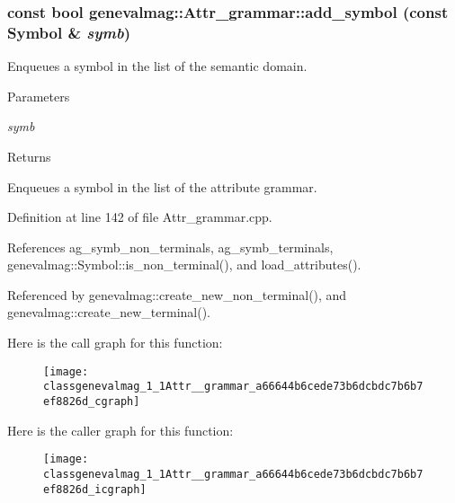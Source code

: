 \hypertarget{classgenevalmag_1_1Attr__grammar_a66644b6cede73b6dcbdc7b6b7ef8826d}{
\subsubsection[{add\_\-symbol}]{\setlength{\rightskip}{0pt plus 5cm}const bool genevalmag::Attr\_\-grammar::add\_\-symbol (const {\bf Symbol} \& {\em symb})}}
\label{classgenevalmag_1_1Attr__grammar_a66644b6cede73b6dcbdc7b6b7ef8826d}
Enqueues a symbol in the list of the semantic domain. 
\begin{DoxyParams}{Parameters}
\item[{\em symb}]\end{DoxyParams}
\begin{DoxyReturn}{Returns}

\end{DoxyReturn}
Enqueues a symbol in the list of the attribute grammar. 

Definition at line 142 of file Attr\_\-grammar.cpp.



References ag\_\-symb\_\-non\_\-terminals, ag\_\-symb\_\-terminals, genevalmag::Symbol::is\_\-non\_\-terminal(), and load\_\-attributes().



Referenced by genevalmag::create\_\-new\_\-non\_\-terminal(), and genevalmag::create\_\-new\_\-terminal().



Here is the call graph for this function:\nopagebreak
\begin{figure}[H]
\begin{center}
\leavevmode
\texttt{[image: classgenevalmag\_1\_1Attr\_\_grammar\_a66644b6cede73b6dcbdc7b6b7ef8826d\_cgraph]}
\end{center}
\end{figure}




Here is the caller graph for this function:\nopagebreak
\begin{figure}[H]
\begin{center}
\leavevmode
\texttt{[image: classgenevalmag\_1\_1Attr\_\_grammar\_a66644b6cede73b6dcbdc7b6b7ef8826d\_icgraph]}
\end{center}
\end{figure}


